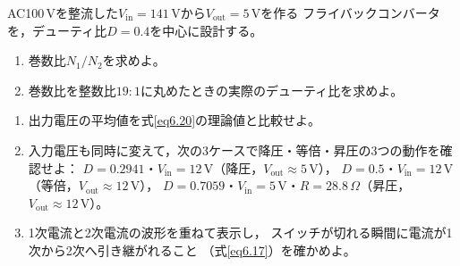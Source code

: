\begin{章末問題}
\item \label{ex6.6}
AC100\,Vを整流した$V_{\mathrm{in}} = 141$\,Vから$V_{\mathrm{out}} = 5$\,Vを作る
フライバックコンバータを，デューティ比$D = 0.4$を中心に設計する。
\begin{enumerate}
\item[(a)] 巻数比$N_1/N_2$を求めよ。
\item[(b)] 巻数比を整数比$19:1$に丸めたときの実際のデューティ比を求めよ。
\end{enumerate}

\item \label{ex6.7}
\begin{enumerate}
\item[(a)] 出力電圧の平均値を式\ref{eq6.20}の理論値と比較せよ。
\item[(b)] 入力電圧も同時に変えて，次の3ケースで降圧・等倍・昇圧の3つの動作を確認せよ：
$D = 0.2941$・$V_{\mathrm{in}} = 12$\,V（降圧，$V_{\mathrm{out}} \approx 5$\,V），
$D = 0.5$・$V_{\mathrm{in}} = 12$\,V（等倍，$V_{\mathrm{out}} \approx 12$\,V），
$D = 0.7059$・$V_{\mathrm{in}} = 5$\,V・$R = 28.8$\,$\Omega$（昇圧，$V_{\mathrm{out}} \approx 12$\,V）。
\item[(c)] 1次電流と2次電流の波形を重ねて表示し，
スイッチが切れる瞬間に電流が1次から2次へ引き継がれること
（式\ref{eq6.17}）を確かめよ。
\end{enumerate}
\end{章末問題}
